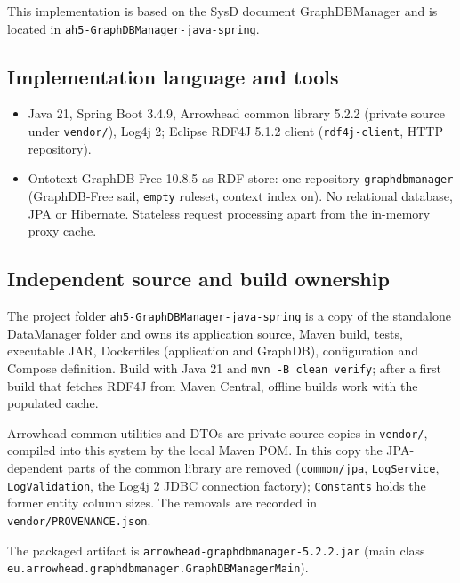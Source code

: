 \documentclass[a4paper]{arrowhead}
\begin{document}
This implementation is based on the SysD document GraphDBManager \cite{gdm-sysd} and is located in \texttt{ah5-GraphDBManager-java-spring}.

\subsection{Implementation language and tools}
\begin{itemize}
\item Java 21, Spring Boot 3.4.9, Arrowhead common library 5.2.2 (private source under \texttt{vendor/}), Log4j 2; Eclipse RDF4J 5.1.2 client \cite{rdf4j} (\texttt{rdf4j-\allowbreak{}client}, HTTP repository).
\item Ontotext GraphDB Free 10.8.5 \cite{graphdb} as RDF store: one repository \texttt{graphdbmanager} (GraphDB-Free sail, \texttt{empty} ruleset, context index on). No relational database, JPA or Hibernate. Stateless request processing apart from the in-memory proxy cache.
\end{itemize}

\subsection{Independent source and build ownership}
The project folder \texttt{ah5-\allowbreak{}GraphDBManager-\allowbreak{}java-\allowbreak{}spring} is a copy of the standalone DataManager folder \cite{dm-sysd-ref} and owns its application source, Maven build, tests, executable JAR, Dockerfiles (application and GraphDB), configuration and Compose definition. Build with Java 21 and \texttt{mvn -B clean verify}; after a first build that fetches RDF4J from Maven Central, offline builds work with the populated cache.

Arrowhead common utilities and DTOs are private source copies in \texttt{vendor/}, compiled into this system by the local Maven POM. In this copy the JPA-dependent parts of the common library are removed (\texttt{common/\allowbreak{}jpa}, \texttt{Log\allowbreak{}Service}, \texttt{Log\allowbreak{}Validation}, the Log4j 2 JDBC connection factory); \texttt{Constants} holds the former entity column sizes. The removals are recorded in \texttt{vendor/\allowbreak{}PROVENANCE.json}.

The packaged artifact is \texttt{arrowhead-\allowbreak{}graphdbmanager-5.2.2.jar} (main class \texttt{eu.\allowbreak{}arrowhead.\allowbreak{}graphdbmanager.\allowbreak{}Graph\allowbreak{}DB\allowbreak{}Manager\allowbreak{}Main}).
\end{document}
